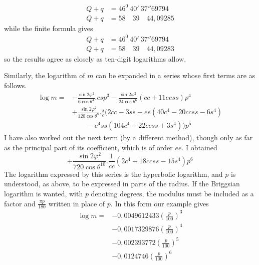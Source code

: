 \[
\begin{aligned}
Q+q&=46^0\ 40'\ 37''69794\\
Q+q&=58\quad39\quad44{,}09285
\end{aligned}
\]
while the finite formula gives
\[
\begin{aligned}
Q+q&=46^0\ 40'\ 37''69794\\
Q+q&=58\quad39\quad44{,}09283
\end{aligned}
\]
so the results agree as closely as ten-digit logarithms allow.

\indent Similarly, the logarithm of \(m\) can be expanded in a series whose first terms are as follows.
\[
\begin{aligned}
\log m={}&-\frac{\sin2\varphi^2}{6\cos\theta^4}\mathord{.}csp^3-\frac{\sin2\varphi^2}{24\cos\theta^6}(cc+11eess)p^4\\
&+\frac{\sin2\varphi^2}{120\cos\theta^8}\mathord{.}\frac{s}{c}(2cc-3ss-ee(40c^4-20ccss-6s^4)\\
&\qquad-e^4ss(104c^4+22ccss+3s^4))p^5
\end{aligned}
\]
I have also worked out the next term (by a different method), though only as far as the principal part of its coefficient, which is of order \(ee\). I obtained
\[
+\frac{\sin2\varphi^2}{720\cos\theta^{10}}\mathord{.}\frac{1}{cc}(2c^4-18ccss-15s^4)p^6
\]
\indent The logarithm expressed by this series is the hyperbolic logarithm, and \(p\) is understood, as above, to be expressed in parts of the radius. If the Briggsian logarithm is wanted, with \(p\) denoting degrees, the modulus must be included as a factor and \(\tfrac{\pi p}{180}\) written in place of \(p\). In this form our example gives
\[
\begin{aligned}
\log m={}&-0{,}0049612433(\frac{p}{100})^3\\
&-0{,}0017329876(\frac{p}{100})^4\\
&-0{,}002393772(\frac{p}{100})^5\\
&-0{,}0124746(\frac{p}{100})^6
\end{aligned}
\]
